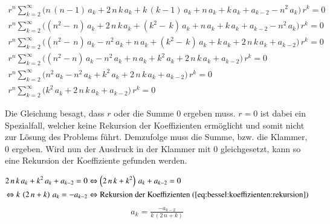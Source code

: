 \begin{align}
	r^n
	\sum_{k=2}^{\infty}
	\biggl(
	n \, \left( n - 1 \right) \, a_k 
	+
	2 \, n \, k \, a_k
	+
	k \, \left( k - 1 \right) \, a_k
	+
	n \, a_k
	+
	k \, a_k
	+
	a_{k - 2}
	-
	n^2 \, a_k
	\biggr)
	\, r^k
	= 0 
	\label{eq:bessel:summe:zusammengefasst}
	\\
	\nonumber
	r^n
	\sum_{k=2}^{\infty}
	\biggl(
	\left( n^2 - \, n \right) \, a_k 
	+
	2 \, n \, k \, a_k
	+
	\left( k^2 - \, k \right) \, a_k
	+
	n \, a_k
	+
	k \, a_k
	+
	a_{k - 2}
	-
	n^2 \, a_k
	\biggr)
	\, r^k
	= 0 
	\\
	\nonumber
	r^n
	\sum_{k=2}^{\infty}
	\biggl(
	\left( n^2 - \, n \right) \, a_k 
	-
	n^2 \, a_k
	+
	n \, a_k
	+
	\left( k^2 - \, k \right) \, a_k
	+
	k \, a_k
	+
	2 \, n \, k \, a_k
	+
	a_{k - 2}
	\biggr)
	\, r^k
	= 0 
	\\
	\nonumber
	r^n
	\sum_{k=2}^{\infty}
	\biggl(
	\left( n^2 - n \right) \, a_k 
	-
	n^2 \, a_k
	+
	n \, a_k
	+
	k^2 \, a_k
	+
	2 \, n \, k \, a_k
	+
	a_{k - 2}
	\biggr)
	\, r^k
	= 0 
	\\
	\nonumber
	r^n
	\sum_{k=2}^{\infty}
	\biggl(
	n^2 \, a_k 
	-
	n^2 \, a_k
	+
	k^2 \, a_k
	+
	2 \, n \, k \, a_k
	+
	a_{k - 2}
	\biggr)
	\, r^k
	= 0 
	\\
	r^n
	\sum_{k=2}^{\infty}
	\biggl(
	k^2 \, a_k
	+
	2 \, n \, k \, a_k
	+
	a_{k - 2}
	\biggr)
	\, r^k
	= 0
	\label{eq:bessel:summe:zusammengefasst:vereinfacht}
\end{align}
\begin{normalsize}%
Die Gleichung  besagt,
dass $r$ oder die Summe $0$ ergeben muss.
$r = 0$ ist dabei ein Spezialfall, welcher keine Rekursion der Koeffizienten erm\"oglicht und somit nicht zur L\"osung des Problems f\"uhrt.
Demzufolge muss die Summe, \acs{bzw.} die Klammer, $0$ ergeben.
Wird nun der Ausdruck in der Klammer mit $0$ gleichgesetzt,
kann so eine Rekursion der Koeffiziente gefunden werden.
\end{normalsize}
\begin{align*}
	2 \, n \, k \, a_k
	+
	k^2 \, a_k
	+
	a_{k - 2}
	= 0
	&\Leftrightarrow
	\left(
	2 \, n \, k 
	+
	k^2 
	\right)
	\, a_k
	+
	a_{k - 2}
	= 0 \\
	\Leftrightarrow
	k \,
	\left(
	2 \, n
	+
	k
	\right)
	\, a_k
	= -a_{k - 2}
	&\Leftrightarrow
	\text{Rekursion der Koeffizienten \refeq{eq:bessel:koeffizienten:rekursion}}
\end{align*}
\begin{align}
	a_k
	=
	\frac
	{
		-a_{k - 2}
	}{
		k \, \left( 2 \, n + k \right)	
	}
	\label{eq:bessel:koeffizienten:rekursion}
\end{align}
